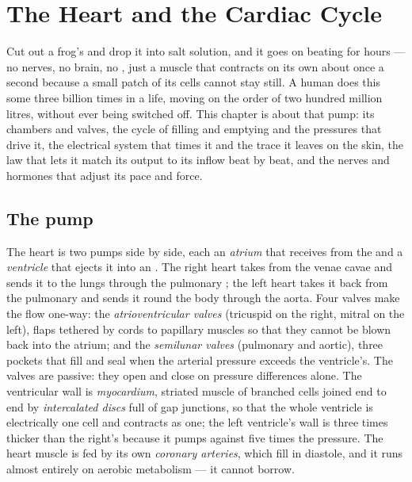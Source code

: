 \chapter{The Heart and the Cardiac Cycle}\label{ch:b2:heart}

Cut out a frog's  and drop it into salt solution, and it goes
on beating for hours --- no nerves, no brain, no , just a
muscle that contracts on its own about once a second because a
small patch of its cells cannot stay still. A human  does this
some three billion times in a life, moving on the order of two
hundred million litres, without ever being switched off. This
chapter is about that pump: its chambers and valves, the cycle of
filling and emptying and the pressures that drive it, the electrical
system that times it and the trace it leaves on the skin, the law
that lets it match its output to its inflow beat by beat, and the
nerves and hormones that adjust its pace and force.

\section{The pump}

\begin{definition}\label{def:b2:heart:anatomy}
The heart is two pumps side by side, each an \emph{atrium} that
receives  from the  and a \emph{ventricle} that ejects it
into an . The right heart takes  from the venae cavae
and sends it to the lungs through the pulmonary ; the left
heart takes it back from the pulmonary  and sends it round the
body through the aorta. Four valves make the flow one-way: the
\emph{atrioventricular valves} (tricuspid on the right, mitral on
the left), flaps tethered by cords to papillary muscles so that
they cannot be blown back into the atrium; and the
\emph{semilunar valves} (pulmonary and aortic), three pockets that
fill and seal when the arterial pressure exceeds the ventricle's.
The valves are passive: they open and close on pressure
differences alone. The ventricular wall is \emph{myocardium},
striated muscle of branched cells joined end to end by
\emph{intercalated discs} full of gap junctions, so that the whole
ventricle is electrically one cell and contracts as one; the left
ventricle's wall is three times thicker than the right's because it
pumps against five times the pressure. The heart muscle is fed by
its own \emph{coronary arteries}, which fill in diastole, and it
runs almost entirely on aerobic metabolism --- it cannot borrow.
\end{definition}

